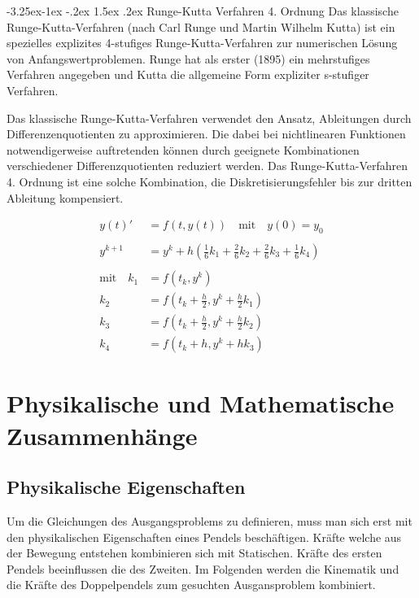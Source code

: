 \documentclass[12pt]{article}
\makeatletter
\numberwithin{equation}{subsection}
\renewcommand\paragraph{\@startsection{paragraph}{4}{\z@}%
  {-3.25ex\@plus -1ex \@minus -.2ex}%
  {1.5ex \@plus .2ex}%
  {\normalfont\normalsize\bfseries}}
\makeatother
\begin{document}
\paragraph{Runge-Kutta Verfahren 4. Ordnung}
Das klassische Runge-Kutta-Verfahren (nach Carl Runge und Martin Wilhelm Kutta) ist ein spezielles explizites 4-stufiges Runge-Kutta-Verfahren zur numerischen Lösung von Anfangswertproblemen. Runge hat als erster (1895) ein mehrstufiges Verfahren angegeben und Kutta die allgemeine Form expliziter s-stufiger Verfahren.

Das klassische Runge-Kutta-Verfahren verwendet den Ansatz, Ableitungen durch Differenzenquotienten zu approximieren. Die dabei bei nichtlinearen Funktionen notwendigerweise auftretenden können durch geeignete Kombinationen verschiedener Differenzquotienten reduziert werden. Das Runge-Kutta-Verfahren 4. Ordnung ist eine solche Kombination, die Diskretisierungsfehler bis zur dritten Ableitung kompensiert.

\begin{align} \label{algo:rk}
	y(t)' &= f(t,y(t)) \quad \text{mit} \quad y(0) = y_0 \nonumber\\
	\nonumber\\
	y^{k+1} &= y^k + h \left(\frac{1}{6}k_1 + \frac{2}{6}k_2 + \frac{2}{6}k_3 + \frac{1}{6}k_4 \right)\\
	\nonumber\\
	\text{mit} \quad k_1 &= f(t_k, y^k) \nonumber\\
	k_2 &= f\left(t_k + \frac{h}{2}, y^k + \frac{h}{2}k_1 \right) \nonumber\\
	k_3 &= f\left(t_k + \frac{h}{2}, y^k + \frac{h}{2}k_2 \right) \nonumber\\
	k_4 &= f\left(t_k + h, y^k + h k_3 \right)\nonumber
\end{align}

\newpage
\section{Physikalische und Mathematische Zusammenhänge}
\subsection{Physikalische Eigenschaften}
Um die Gleichungen des Ausgangsproblems zu definieren, muss man sich erst mit den physikalischen Eigenschaften eines Pendels beschäftigen. Kräfte welche aus der Bewegung entstehen kombinieren sich mit Statischen. Kräfte des ersten Pendels beeinflussen die des Zweiten. Im Folgenden werden die Kinematik und die Kräfte des Doppelpendels zum gesuchten Ausgansproblem kombiniert.
\end{document}
